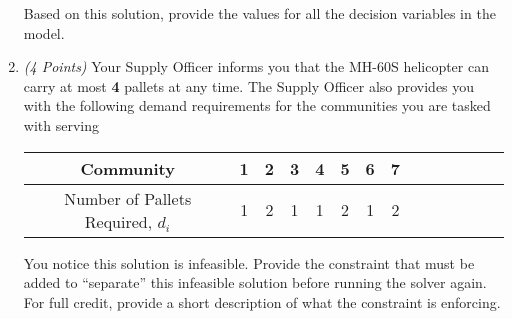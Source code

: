 \documentclass[10pt]{article}
\newcommand{\points}[1]{{\it (#1 Points)}}
\begin{document}
\begin{enumerate}
\begin{center}
\begin{tikzpicture}
        \end{tikzpicture}
\end{center}

Based on this solution, provide the values for all the decision variables in the model.

  \vfill

\item \points{4} Your Supply Officer informs you that the MH-60S helicopter can carry at most {\bf 4} pallets at any time.  The Supply Officer also provides you with the following demand requirements for the communities you are tasked with serving

\begin{center}
\begin{tabular}{c|c|c|c|c|c|c|c|c|c|c|c|c|c|}
Community &  1	&	2	&	3	&	4	& 5	&	6   & 7   \\
\hline
Number of Pallets Required, $d_i$  & 1	&	2	&	1	&	1	&	2	&	1	&   2
\end{tabular}
\end{center}

You notice this solution is infeasible.  Provide the constraint that must be added to ``separate'' this infeasible solution before running the solver again.  For full credit, provide a short description of what the constraint is enforcing.
%
%

\vfill


\end{enumerate}
\end{document}
